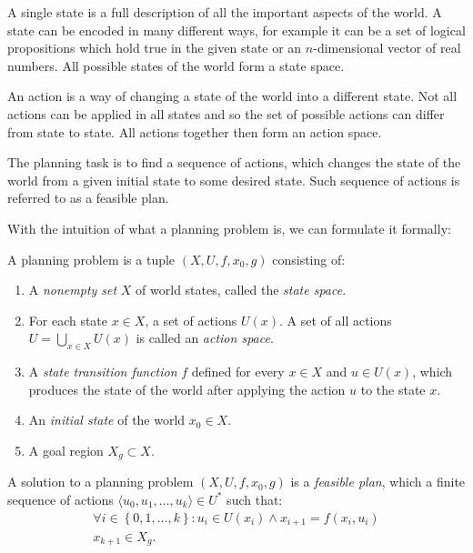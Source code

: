 A single state is a full description of all the important aspects of the world. A state can be encoded in many different ways, for example it can be a set of logical propositions which hold true in the given state or an $n$-dimensional vector of real numbers. All possible states of the world form a state space.

An action is a way of changing a state of the world into a different state. Not all actions can be applied in all states and so the set of possible actions can differ from state to state. All actions together then form an action space.

The planning task is to find a sequence of actions, which changes the state of the world from a given initial state to some desired state. Such sequence of actions is referred to as a feasible plan.

With the intuition of what a planning problem is, we can formulate it formally:

\begin{defn}
	\label{def:basic_planning_problem}
	A planning problem is a tuple $\left(X, U, f, x_0, g\right)$ consisting of:
	
	\begin{enumerate}
		\item A \textit{nonempty set} $X$ of world states, called the \textit{state space}.
		\item For each state $x\in X$, a set of actions $U(x)$.  A set of all actions $U=\bigcup\limits_{x\in X} U(x)$ is called an \textit{action space}.
		\item A \textit{state transition function} $f$ defined for every $x\in X$ and $u\in U(x)$, which produces the state of the world after applying the action $u$ to the state $x$.
		\item An \textit{initial state} of the world $x_0\in X$.
		\item A goal region $X_g\subset X$.
	\end{enumerate}
\end{defn}

\begin{defn}
	A solution to a planning problem $\left(X, U, f, x_0, g\right)$ is a \textit{feasible plan}, which a finite sequence of actions $\langle u_0, u_1, \ldots, u_k\rangle\in U^*$ such that:	
	\begin{gather*}
		\forall i \in \left\{0,1,\ldots,k\right\}: u_i\in U(x_i) \wedge x_{i+1}=f(x_i, u_i) \\
		x_{k+1} \in X_g.
	\end{gather*}
\end{defn}

